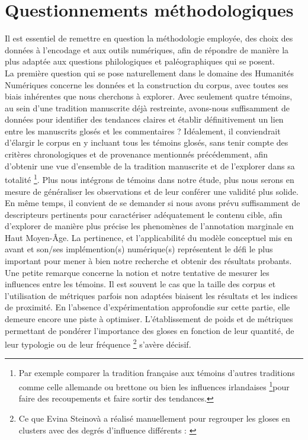 \documentclass[a4paper, twoside, 12pt]{book}
\begin{document}
{\section{Questionnements méthodologiques}

Il est essentiel de remettre en question la méthodologie employée, des choix des données à l'encodage et aux outils numériques, afin de répondre de manière la plus adaptée aux questions philologiques et paléographiques qui se posent.\\

La première question qui se pose naturellement dans le domaine des Humanités Numériques concerne les données et la construction du corpus, avec toutes ses biais inhérentes que nous cherchons à explorer. Avec seulement quatre témoins, au sein d'une tradition manuscrite déjà restreinte, avons-nous suffisamment de données pour identifier des tendances claires et établir définitivement un lien entre les manuscrits glosés et les commentaires ? Idéalement, il conviendrait d'élargir le corpus en y incluant tous les témoins glosés, sans tenir compte des critères chronologiques et de provenance mentionnés précédemment, afin d'obtenir une vue d'ensemble de la tradition manuscrite et de l'explorer dans sa totalité \footnote{
Par exemple comparer la \og{}tradition française\fg{} aux témoins d'autres traditions comme celle \og{}allemande\fg{} ou \og{}brettone\fg{} ou bien les influences irlandaises \footnote{voir l'étude comparative de Lémoine : \cite{lemoine1989symptomes}}pour faire des recoupements et faire sortir des tendances.}. Plus nous intégrons de témoins dans notre étude, plus nous serons en mesure de généraliser les observations et de leur conférer une validité plus solide. \\


En même temps, il convient de se demander si nous avons prévu suffisamment de descripteurs pertinents pour caractériser adéquatement le contenu cible, afin d'explorer de manière plus précise les phenomènes de l'annotation marginale en Haut Moyen-Âge. La pertinence, et l'applicabilité du modèle conceptuel mis en avant et son/ses implémention(s) numérique(s) représentent le défi le plus important pour mener à bien notre recherche et obtenir des résultats probants.\\

Une petite remarque concerne la notion et notre tentative de \og{}mesurer\fg{} les influences entre les témoins. Il est souvent le cas que la taille des corpus et l'utilisation de métriques parfois non adaptées biaisent les résultats et les indices de proximité. En l'absence d'expérimentation approfondie sur cette partie, elle demeure encore une piste à optimiser. L'établissement de \og{}poids\fg{} et de métriques permettant de pondérer l'importance des gloses en fonction de leur quantité, de leur typologie ou de leur fréquence \footnote{Ce que Evina Steinovà a réalisé manuellement pour regrouper les gloses en \og{}clusters\fg{} avec des degrés d'influence différents : \cite{steinova2021glosses}} s'avère décisif.\\

}
\end{document}
